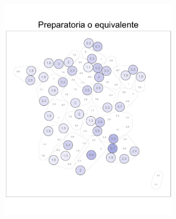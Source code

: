 \begin{figure}
\begin{subfigure}{0.275\textwidth}
	\includegraphics[width = \textwidth]{Figs/Efectos/Dorling_Efectos_Dip3_Modelo_H}
	\end{subfigure}
	~
	\begin{subfigure}{0.275\textwidth}

\end{subfigure}
\end{figure}
